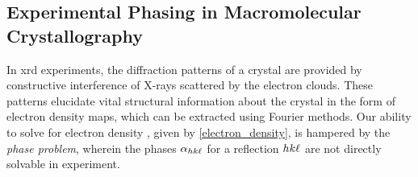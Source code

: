 

\subsection{Experimental Phasing in Macromolecular Crystallography}




In \ac{xrd} experiments, the diffraction patterns of a crystal are provided by constructive interference of X-rays scattered by the electron clouds. These patterns elucidate vital structural information about the crystal in the form of electron density maps, which can be extracted using Fourier methods. Our ability to solve for electron density , given by \cref{electron_density}, is hampered by the \textit{phase problem}, wherein the phases $\alpha_{hk\ell}$ for a reflection $hk\ell$ are not directly solvable in experiment. 

